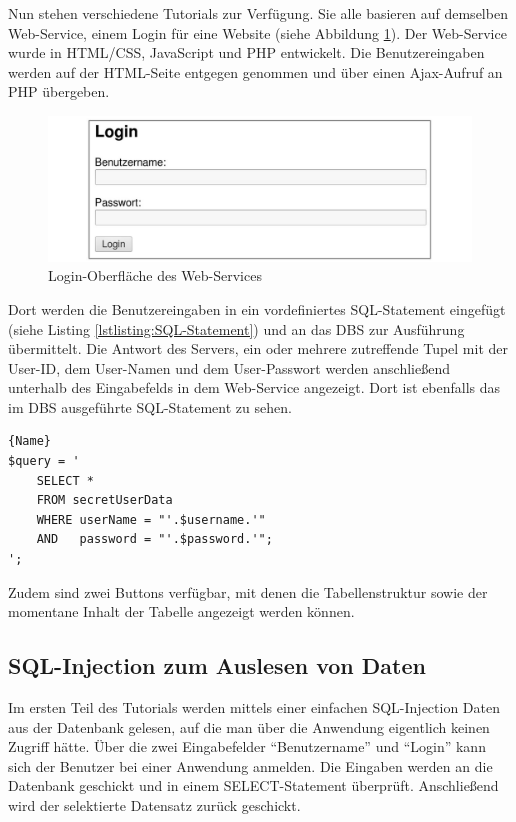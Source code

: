 Nun stehen verschiedene Tutorials zur Verfügung. Sie alle basieren auf demselben Web-Service, einem Login für eine Website (siehe Abbildung \ref{fig:user}). Der Web-Service wurde in HTML/CSS, JavaScript und PHP entwickelt. Die Benutzereingaben werden auf der HTML-Seite entgegen genommen und über einen Ajax-Aufruf an PHP übergeben. 

\begin{figure}[H]
	\centering
	\includegraphics[width=\textwidth]{images/SQL_Injection/login.jpg}
	\caption{Login-Oberfläche des Web-Services}
	\label{fig:user}
\end{figure}

Dort werden die Benutzereingaben in ein vordefiniertes SQL-Statement eingefügt (siehe Listing \ref{lstlisting:SQL-Statement}) und an das DBS zur Ausführung übermittelt. Die Antwort des Servers, ein oder mehrere zutreffende Tupel mit der User-ID, dem User-Namen und dem User-Passwort werden anschließend unterhalb des Eingabefelds in dem Web-Service angezeigt. Dort ist ebenfalls das im DBS ausgeführte SQL-Statement zu sehen.

\begin{lstlisting}[caption=SQL-Statement\label{lstlisting:SQL-Statement}]{Name}
$query = '
	SELECT * 
	FROM secretUserData 
	WHERE userName = "'.$username.'" 
	AND   password = "'.$password.'";
';
\end{lstlisting}

Zudem sind zwei Buttons verfügbar, mit denen die Tabellenstruktur sowie der momentane Inhalt der Tabelle angezeigt werden können.

\subsection{SQL-Injection zum Auslesen von Daten}
Im ersten Teil des Tutorials werden mittels einer einfachen SQL-Injection Daten aus der Datenbank gelesen, auf die man über die Anwendung eigentlich keinen Zugriff hätte. Über die zwei Eingabefelder \enquote{Benutzername} und \enquote{Login} kann sich der Benutzer bei einer Anwendung anmelden. Die Eingaben werden an die Datenbank geschickt und in einem SELECT-Statement überprüft. Anschließend wird der selektierte Datensatz zurück geschickt.

